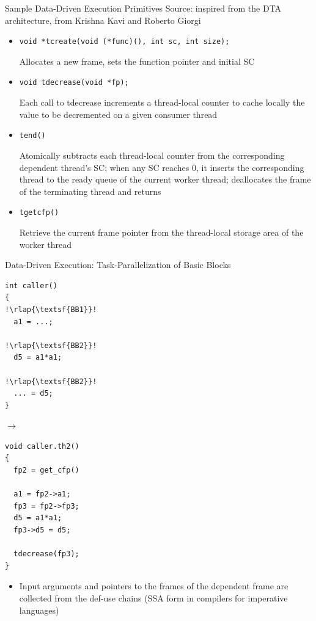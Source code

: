 \documentclass[xcolor=dvipsnames,9pt,mathserif]{beamer}
\renewcommand{\emph}[1]{\alert{#1}}
\begin{document}
\begin{frame}{Sample Data-Driven Execution Primitives}
  Source: inspired from the DTA architecture, from Krishna Kavi and
  Roberto Giorgi

  \begin{itemize}
  \item \texttt{void *tcreate(void (*func)(), int sc, int size);}

    Allocates a new frame, sets the function pointer and initial SC

    \medskip
  \item   \texttt{void tdecrease(void *fp);}

    Each call to tdecrease increments a thread-local counter to cache
    locally the value to be decremented on a given consumer thread

    \medskip
  \item \texttt{tend()}

    Atomically subtracts each thread-local counter from the
    corresponding dependent thread's SC; when any SC reaches 0, it
    inserts the corresponding thread to the ready queue of the current
    worker thread; deallocates the frame of the terminating thread and
    returns

    \medskip
  \item \texttt{tgetcfp()}

    Retrieve the current frame pointer from the thread-local storage
    area of the worker thread
  \end{itemize}
\end{frame}

\begin{frame}[fragile]{Data-Driven Execution:
    Task-Parallelization of Basic Blocks}
  \begin{minipage}{.2\columnwidth}  
     \begin{lstlisting}[escapechar=!]
int caller()
{
!\rlap{\textsf{BB1}}!
  a1 = ...;

!\rlap{\textsf{BB2}}!
  d5 = a1*a1;

!\rlap{\textsf{BB2}}!
  ... = d5;
}
    \end{lstlisting}
  \end{minipage}
  \qquad
  $\to$
  \qquad
  \begin{minipage}{.2\columnwidth}  
   \begin{lstlisting}[escapechar=!]
void caller.th2()
{
  fp2 = get_cfp()

  a1 = fp2->a1;
  fp3 = fp2->fp3;
  d5 = a1*a1;
  fp3->d5 = d5;

  tdecrease(fp3);
}
    \end{lstlisting}
  \end{minipage}
  \hfill
  \begin{minipage}{.5\textwidth}  
    \begin{itemize}
    \item Input arguments and pointers to the frames of the dependent
      frame are collected from the \emph{def-use chains} (SSA form in
      compilers for imperative languages)
    \end{itemize}
  \end{minipage}
\end{frame}
\end{document}
